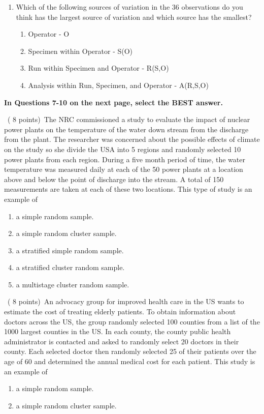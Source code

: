 \documentclass[10pt]{report}
\def\be{\begin{enumerate}}
\def\ee{\end{enumerate}}
\begin{document}
\begin{enumerate}
\item[b.]  Which of the following sources of variation in the 36 observations do you think has the largest source of variation and which source has the smallest?
\be
\item[$\bullet$] Operator - O
\item[$\bullet$] Specimen within Operator - S(O)
\item[$\bullet$] Run within Specimen and Operator - R(S,O)
\item[$\bullet$] Analysis within Run, Specimen, and Operator - A(R,S,O)
\ee\ee
\vskip2mm
\item[$\bullet$]{\bf In Questions 7-10 on the next page, select the BEST answer.}
\vskip2mm
\vfill\newpage
\item[7.]\ ( 8 points)\  The NRC commissioned a study to evaluate the impact of nuclear power plants
on the temperature of the water down stream from the discharge from the plant.  The researcher was concerned about
the possible effects of climate on the study so she divide the USA into 5 regions and randomly selected 10 power plants
from each region. During a five month period of time, the water temperature was measured daily at each of the 50 power plants
at a location above and below the point of discharge into the stream. A total of 150 measurements are taken at
each of these two locations.  This type of study is an example of
\be
\item[A.] a simple random sample.
\item[B.] a simple random cluster sample.
\item[C.] a stratified simple random sample.
\item[D.] a stratified cluster random sample.
\item[E.] a multistage cluster random sample.
\ee
\item[8.]\ ( 8 points)\    An advocacy group for improved health care in the US wants to estimate the cost of treating elderly patients.
To obtain information about doctors across the US, the group randomly selected 100 counties from a list of the 1000 largest
counties in the US. In each county, the county public health administrator is contacted and asked to randomly select 20
doctors in their county. Each selected doctor then randomly selected 25 of their patients over the age of 60 and
determined the annual medical cost for each patient.  This study is an example of
\be
\item[A.] a simple random sample.
\item[B.] a simple random cluster sample.

\end{enumerate}
\end{document}
